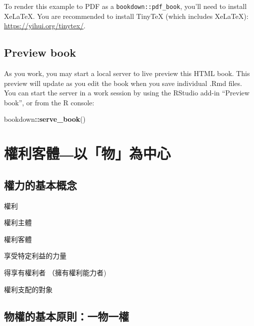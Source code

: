 \documentclass[
]{book}
\newenvironment{Shaded}{\begin{snugshade}}{\end{snugshade}}
\newcommand{\FunctionTok}[1]{\textcolor[rgb]{0.13,0.29,0.53}{\textbf{#1}}}
\newcommand{\NormalTok}[1]{#1}
\newcommand{\SpecialCharTok}[1]{\textcolor[rgb]{0.81,0.36,0.00}{\textbf{#1}}}
\begin{document}
To render this example to PDF as a \texttt{bookdown::pdf\_book}, you'll need to install XeLaTeX. You are recommended to install TinyTeX (which includes XeLaTeX): \url{https://yihui.org/tinytex/}.

\hypertarget{preview-book}{%
\section{Preview book}\label{preview-book}}

As you work, you may start a local server to live preview this HTML book. This preview will update as you edit the book when you save individual .Rmd files. You can start the server in a work session by using the RStudio add-in ``Preview book'', or from the R console:

\begin{Shaded}
\begin{Highlighting}[]
\NormalTok{bookdown}\SpecialCharTok{::}\FunctionTok{serve\_book}\NormalTok{()}
\end{Highlighting}
\end{Shaded}

\hypertarget{ux6b0aux5229ux5ba2ux9ad4ux4ee5ux7269ux70baux4e2dux5fc3}{%
\chapter{權利客體―以「物」為中心}\label{ux6b0aux5229ux5ba2ux9ad4ux4ee5ux7269ux70baux4e2dux5fc3}}

\hypertarget{ux6b0aux529bux7684ux57faux672cux6982ux5ff5}{%
\section{權力的基本概念}\label{ux6b0aux529bux7684ux57faux672cux6982ux5ff5}}

權利

權利主體

權利客體

享受特定利益的力量

得享有權利者
（擁有權利能力者)

權利支配的對象

\hypertarget{ux7269ux6b0aux7684ux57faux672cux539fux5247ux4e00ux7269ux4e00ux6b0a}{%
\section{物權的基本原則：一物一權}\label{ux7269ux6b0aux7684ux57faux672cux539fux5247ux4e00ux7269ux4e00ux6b0a}}
\end{document}
